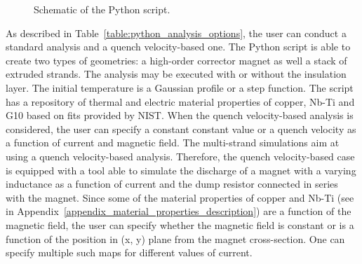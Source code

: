 \begin{figure}[H]
    \caption{Schematic of the Python script.}
    \label{fig:block_diagram_python_architecture}
\end{figure}

As described in Table~\ref{table:python_analysis_options}, the user can conduct a standard analysis and a quench velocity-based one. The Python script is able to create two types of geometries: a high-order corrector magnet as well a stack of extruded strands. The analysis may be executed with or without the insulation layer. The initial temperature is a Gaussian profile or a step function. The script has a repository of thermal and electric material properties of copper, Nb-Ti and G10 based on fits provided by NIST. When the quench velocity-based analysis is considered, the user can specify a constant constant value or a quench velocity as a function of current and magnetic field. The multi-strand simulations aim at using a quench velocity-based analysis. Therefore, the quench velocity-based case is equipped with a tool able to simulate the discharge of a magnet with a varying inductance as a function of current and the dump resistor connected in series with the magnet.  Since some of the material properties of copper and Nb-Ti (see in Appendix~\ref{appendix_material_properties_description}) are a function of the magnetic field, the user can specify whether the magnetic field is constant or is a function of the position in (x, y) plane from the magnet cross-section. One can specify multiple such maps for different values of current.

